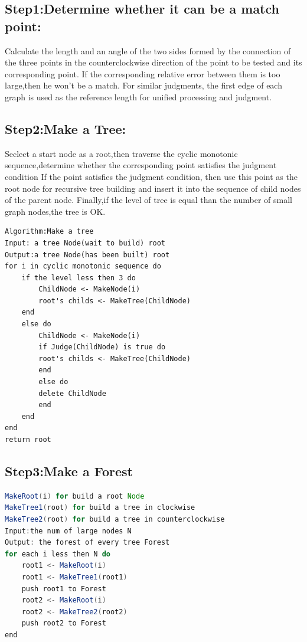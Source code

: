 \documentclass[12pt]{article}
\begin{document}
\subsection*{Step1:Determine whether it can be a match point:}
Calculate the length and an angle of the two sides formed by 
the connection of the three points in the counterclockwise direction of the point to be tested and its corresponding point.
If the corresponding relative error between them is too large,then he won't be a match.
For similar judgments, the first edge of each graph is used as the reference length for unified processing and judgment.

\subsection*{Step2:Make a Tree:}
Seclect a start node as a root,then traverse the cyclic monotonic sequence,determine whether the corresponding point satisfies the judgment condition
If the point satisfies the judgment condition, then use this point as the root node for recursive tree building and insert it into the sequence of child nodes of the parent node.
Finally,if the level of tree is equal than the number of small graph nodes,the tree is OK.
\begin{lstlisting}
Algorithm:Make a tree
Input: a tree Node(wait to build) root
Output:a tree Node(has been built) root
for i in cyclic monotonic sequence do
    if the level less then 3 do
        ChildNode <- MakeNode(i)
        root's childs <- MakeTree(ChildNode)
    end
    else do
        ChildNode <- MakeNode(i)
        if Judge(ChildNode) is true do
        root's childs <- MakeTree(ChildNode)
        end
        else do 
        delete ChildNode
        end
    end
end
return root

\end{lstlisting}

\subsection*{Step3:Make a Forest}
\begin{lstlisting}[language=java]
MakeRoot(i) for build a root Node
MakeTree1(root) for build a tree in clockwise
MakeTree2(root) for build a tree in counterclockwise
Input:the num of large nodes N
Output: the forest of every tree Forest
for each i less then N do
    root1 <- MakeRoot(i)
    root1 <- MakeTree1(root1)
    push root1 to Forest
    root2 <- MakeRoot(i)
    root2 <- MakeTree2(root2)
    push root2 to Forest
end
\end{lstlisting}
\end{document}
